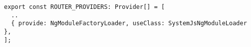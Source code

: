 \begin{verbatim}
export const ROUTER_PROVIDERS: Provider[] = [
  ..
  { provide: NgModuleFactoryLoader, useClass: SystemJsNgModuleLoader },
];
\end{verbatim}
